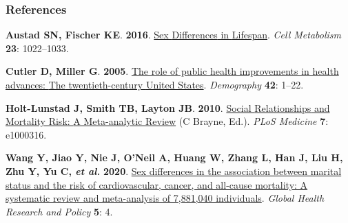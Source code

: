 \documentclass[
  10pt,
  twocolumn]{article}
\newlength{\cslhangindent}
\newenvironment{CSLReferences}[2] %
 {\begin{list}{}{%
  \setlength{\itemindent}{0pt}
  \setlength{\leftmargin}{0pt}
  \setlength{\parsep}{0pt}
  \ifodd #1
   \setlength{\leftmargin}{\cslhangindent}
   \setlength{\itemindent}{-1\cslhangindent}
  \fi
  \setlength{\itemsep}{#2\baselineskip}}}
 {\end{list}}
\begin{document}
\newpage

\subsubsection{References}\label{references}

\protect{}\label{refs}
\begin{CSLReferences}{0}{1}
\textbf{\textbf{Austad SN}, \textbf{Fischer KE}}. \textbf{2016}.
\href{https://doi.org/10.1016/j.cmet.2016.05.019}{Sex {Differences} in
{Lifespan}}. \emph{Cell Metabolism} \textbf{23}: 1022--1033.

\textbf{\textbf{Cutler D}, \textbf{Miller G}}. \textbf{2005}.
\href{https://doi.org/10.1353/dem.2005.0002}{The role of public health
improvements in health advances: {The} twentieth-century {United
States}}. \emph{Demography} \textbf{42}: 1--22.

\textbf{\textbf{Holt-Lunstad J}, \textbf{Smith TB}, \textbf{Layton JB}}.
\textbf{2010}.
\href{https://doi.org/10.1371/journal.pmed.1000316}{Social
{Relationships} and {Mortality Risk}: {A Meta}-analytic {Review}} (C
Brayne, Ed.). \emph{PLoS Medicine} \textbf{7}: e1000316.

\textbf{\textbf{Wang Y}, \textbf{Jiao Y}, \textbf{Nie J}, \textbf{O'Neil
A}, \textbf{Huang W}, \textbf{Zhang L}, \textbf{Han J}, \textbf{Liu H},
\textbf{Zhu Y}, \textbf{Yu C}, \emph{et al.}} \textbf{2020}.
\href{https://doi.org/10.1186/s41256-020-00133-8}{Sex differences in the
association between marital status and the risk of cardiovascular,
cancer, and all-cause mortality: A systematic review and meta-analysis
of 7,881,040 individuals}. \emph{Global Health Research and Policy}
\textbf{5}: 4.

\end{CSLReferences}
\end{document}
